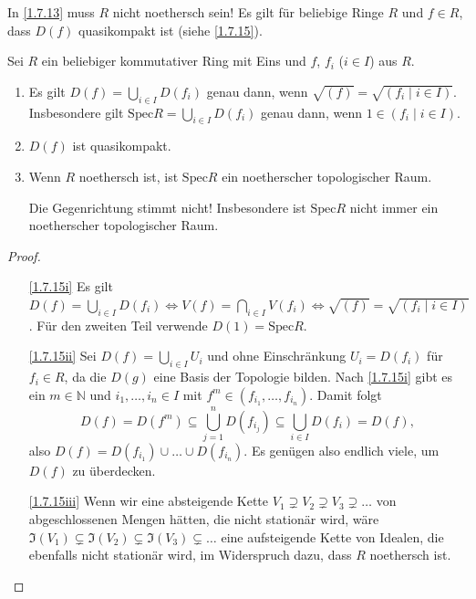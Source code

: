 \documentclass[a4paper,12pt]{scrbook}
\newtheorem{proof}{Beweis}
\def\I{\mathfrak{I}}
\newcommand{\Spec}{\mathrm{Spec}}
\newcommand{\set}[1]{\ensuremath{\mathbb{#1}}}
\newcommand{\N}{\set{N}}
\begin{document}
\begin{bem*}
  In \cref{1.7.13} muss $R$ nicht noethersch sein! Es gilt für beliebige Ringe $R$ und $f\in R$, dass $D(f)$ quasikompakt ist
  (siehe \cref{1.7.15}).
\end{bem*}

\begin{bem}\label{1.7.15}
  Sei $R$ ein beliebiger kommutativer Ring mit Eins und $f$, $f_i$ ($i\in I$) aus $R$.
  \begin{enumerate}
  \item{} Es gilt $\displaystyle D(f)=\bigcup_{i\in I}D(f_i)$ genau dann, wenn $\sqrt{(f)}=\sqrt{(f_i\mid i\in
      I)}$. Insbesondere gilt $\displaystyle\Spec R=\bigcup_{i\in I}D(f_i)$ genau dann, wenn $1\in(f_i\mid i\in I)$.
  \item{} $D(f)$ ist quasikompakt.
  \item{} Wenn $R$ noethersch ist, ist $\Spec R$ ein noetherscher topologischer Raum.
    \begin{w}
      Die Gegenrichtung stimmt nicht! Insbesondere ist $\Spec R$ nicht immer ein noetherscher topologischer Raum.
    \end{w}
  \end{enumerate}
\end{bem}
\begin{proof}
  \begin{enumerate}
  \item[\ref{1.7.15i}] Es gilt $\displaystyle D(f)=\bigcup_{i\in I}D(f_i) \iff V(f)=\bigcap_{i\in I}V(f_i) \iff
    \sqrt{(f)}=\sqrt{(f_i\mid i\in I)}$. Für den zweiten Teil verwende $D(1)=\Spec R$.
  \item[\ref{1.7.15ii}] Sei $D(f)=\bigcup_{i\in I} U_i$ und ohne Einschränkung $U_i=D(f_i)$ für $f_i\in R$, da die $D(g)$ eine
    Basis der Topologie bilden. Nach \ref{1.7.15i} gibt es ein $m\in\N$ und $i_1,\dotsc,i_n\in I$ mit
    $f^m\in(f_{i_1},\dotsc,f_{i_n})$. Damit folgt \[ D(f)=D(f^m)\subseteq\bigcup_{j=1}^n D(f_{i_j}) \subseteq\bigcup_{i\in I}
    D(f_i) = D(f), \] also $D(f)=D(f_{i_1})\cup\dotso\cup D(f_{i_n})$. Es genügen also endlich viele, um $D(f)$ zu überdecken.
  \item[\ref{1.7.15iii}] Wenn wir eine absteigende Kette $V_1\supsetneq V_2\supsetneq V_3\supsetneq\dotso$ von abgeschlossenen
    Mengen hätten, die nicht stationär wird, wäre $\I(V_1)\subsetneq\I(V_2)\subsetneq\I(V_3)\subsetneq\dotso$ eine aufsteigende
    Kette von Idealen, die ebenfalls nicht stationär wird, im Widerspruch dazu, dass $R$ noethersch ist.
  \end{enumerate}
\end{proof}
\end{document}
